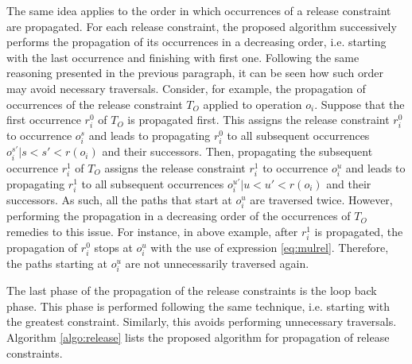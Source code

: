 The same idea applies to the order in which occurrences of a release constraint are propagated. For each release constraint, the proposed algorithm successively performs the propagation of its occurrences in a decreasing order, i.e. starting with the last occurrence and finishing with first one. Following the same reasoning presented in the previous paragraph, it can be seen how such order may avoid necessary traversals. Consider, for example, the propagation of occurrences of the release constraint $T_O$ applied to operation $o_i$. Suppose that the first occurrence $r_i^0$ of $T_O$ is propagated first. This assigns the release constraint $r_i^0$ to occurrence $o_i^s$ and leads to propagating $r_i^0$ to all subsequent occurrences $o_i^{s'} | s < s' < r(o_i) $ and their successors. Then, propagating the subsequent occurrence $r_i^1$ of $T_O$ assigns the release constraint $r_i^1$ to occurrence $o_i^u$ and leads to propagating $r_i^1$ to all subsequent occurrences $o_i^{u'} | u < u' < r(o_i) $ and their successors. As such, all the paths that start at $o_i^{u}$ are traversed twice. However, performing the propagation in a decreasing order of the occurrences of $T_O$ remedies to this issue. For instance, in above example, after $r_i^1$ is propagated, the propagation of $r_i^0$ stops at $o_i^{u}$ with the use of expression \ref{eq:mulrel}. Therefore, the paths starting at $o_i^{u}$ are not unnecessarily traversed again.

The last phase of the propagation of the release constraints is the loop back phase. This phase is performed following the same technique, i.e. starting with the greatest constraint. Similarly, this avoids performing unnecessary traversals. Algorithm \ref{algo:release} lists the proposed algorithm for propagation of release constraints.

